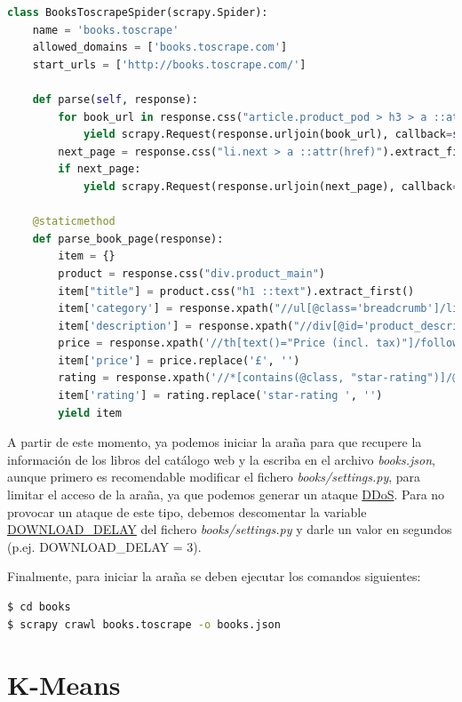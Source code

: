 \documentclass{uimppracticas}
\begin{document}
\begin{lstlisting}[language=python, basicstyle=\small]
class BooksToscrapeSpider(scrapy.Spider):
	name = 'books.toscrape'
	allowed_domains = ['books.toscrape.com']
	start_urls = ['http://books.toscrape.com/']
	
	def parse(self, response):
		for book_url in response.css("article.product_pod > h3 > a ::attr(href)").extract():
			yield scrapy.Request(response.urljoin(book_url), callback=self.parse_book_page)
		next_page = response.css("li.next > a ::attr(href)").extract_first()
		if next_page:
			yield scrapy.Request(response.urljoin(next_page), callback=self.parse)
	
	@staticmethod
	def parse_book_page(response):
		item = {}
		product = response.css("div.product_main")
		item["title"] = product.css("h1 ::text").extract_first()
		item['category'] = response.xpath("//ul[@class='breadcrumb']/li[@class='active']/preceding-sibling::li[1]/a/text()").extract_first()
		item['description'] = response.xpath("//div[@id='product_description']/following-sibling::p/text()").extract_first()
		price = response.xpath('//th[text()="Price (incl. tax)"]/following-sibling::td/text()').extract_first()
		item['price'] = price.replace('£', '')
		rating = response.xpath('//*[contains(@class, "star-rating")]/@class').extract_first()
		item['rating'] = rating.replace('star-rating ', '')
		yield item
\end{lstlisting}

A partir de este momento, ya podemos iniciar la araña para que recupere la información de los libros del catálogo web y la escriba en el archivo \textit{books.json}, aunque primero es recomendable modificar el fichero \textit{books/settings.py}, para limitar el acceso de la araña, ya que podemos generar un ataque \href{https://es.wikipedia.org/wiki/Ataque\_de\_denegaci\%C3\%B3n_de_servicio}{DDoS}. Para no provocar un ataque de este tipo, debemos descomentar la variable \href{https://docs.scrapy.org/en/latest/topics/settings.html#download-delay}{DOWNLOAD\_DELAY} del fichero \textit{books/settings.py}  y darle un valor en segundos (p.ej. DOWNLOAD\_DELAY = 3). 

Finalmente, para iniciar la araña se deben ejecutar los comandos siguientes:	

\begin{lstlisting}[language=bash, basicstyle=\small]
$ cd books
$ scrapy crawl books.toscrape -o books.json
\end{lstlisting}

\section{K-Means}\label{kmeans} 
\end{document}
